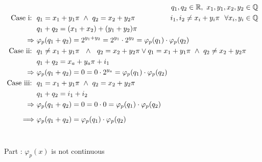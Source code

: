 \documentclass[12pt, a4paper]{article}
\newcommand{\rom}[1]{\uppercase\expandafter{\romannumeral #1\relax}}
\begin{document}
\begin{align*}
& & \mathllap{q_1,q_2\in \mathbb{R},~ x_1,y_1,x_2,y_2\in\mathbb{Q}}\\
\text{Case \rom{1}:~~} & q_1 = x_1 + y_1\pi ~\wedge~ q_2 = x_2 + y_2\pi & ~~\mathllap{i_1,i_2 \neq x_i+y_i\pi ~~\forall x_i,y_i\in\mathbb{Q}}\\
& q_1 + q_2 = (x_1+x_2) + (y_1+y_2)\pi\\
\Rightarrow~ & \varphi_p(q_1 + q_2) = 2^{y_1+y_2} = 2^{y_1} \cdot 2^{y_2} =\varphi_p(q_1) \cdot \varphi_p(q_2)\\
\text{Case \rom{2}:~~} & q_1 \neq x_1 + y_1\pi ~~\wedge~~ q_2 = x_2 + y_2\pi \vee q_1 = x_1 + y_1\pi ~\wedge~ q_2 \neq x_2 + y_2\pi\\
& q_1 + q_2 = x_a + y_a\pi + i_1\\
\Rightarrow~ & \varphi_p(q_1 + q_2) = 0 = 0 \cdot 2^{y_a} =\varphi_p(q_1) \cdot \varphi_p(q_2)\\
\text{Case \rom{3}:~~} & q_1 = x_1 + y_1\pi ~\wedge~ q_2 = x_2 + y_2\pi \\
& q_1 + q_2 = i_1 + i_2\\
\Rightarrow~ & \varphi_p(q_1 + q_2) = 0 = 0 \cdot 0 =\varphi_p(q_1) \cdot \varphi_p(q_2)\vspace*{20mm} \\
\Longrightarrow~ & \varphi_p(q_1 + q_2) = \varphi_p(q_1) \cdot \varphi_p(q_2) \phantom{a^{b^{c^{d^e}}}}\\
\end{align*}
\vspace*{0mm}\\
\begin{Large}Part \rom{2}: $\varphi_p(x)$ is not continuous\end{Large}
\end{document}
